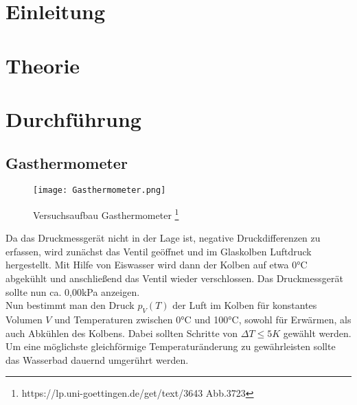 \documentclass[12pt, a4paper, twoside]{scrartcl}
\begin{document}

\cleardoublepage
\tableofcontents
\cleardoublepage
\setcounter{page}{1}

\section{Einleitung}
\label{sec:einleitung}


\section{Theorie}
\label{sec:theorie}


\section{Durchführung}
\label{sec:durchfuehrung}
\subsection{Gasthermometer}
\begin{figure}
	\centering
	\texttt{[image: Gasthermometer.png]}
	\caption{Versuchsaufbau Gasthermometer \footnote{https://lp.uni-goettingen.de/get/text/3643 Abb.3723}}
\end{figure}
Da das Druckmessgerät nicht in der Lage ist, negative  Druckdifferenzen zu erfassen, wird zunächst das Ventil geöffnet und im Glaskolben Luftdruck hergestellt. Mit Hilfe von Eiswasser wird dann der Kolben auf etwa 0°C abgekühlt und anschließend das Ventil wieder verschlossen. Das Druckmessgerät sollte nun ca. 0,00kPa anzeigen. \\
Nun bestimmt man den Druck $p_V \left( T \right)$ der Luft im Kolben für konstantes Volumen $V$ und Temperaturen zwischen 0°C und 100°C, sowohl für Erwärmen, als auch Abkühlen des Kolbens. Dabei sollten Schritte von $\Delta T \le 5K $ gewählt werden. Um eine möglichste gleichförmige Temperaturänderung zu gewährleisten sollte das Wasserbad dauernd umgerührt werden.
\end{document}
